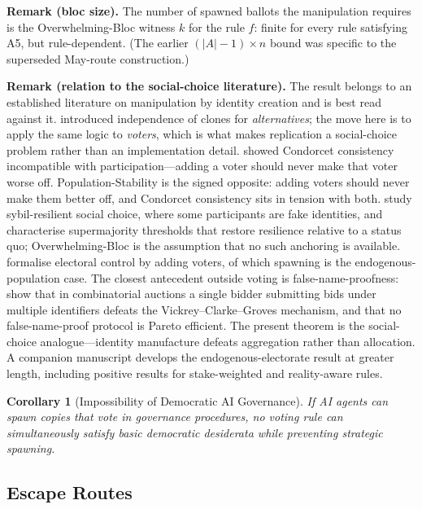 \documentclass[12pt]{article}
\newtheorem{corollary}[theorem]{Corollary}
\newcommand{\added}[1]{\textbf{#1}}
\begin{document}
\noindent\added{\textbf{Remark (bloc size).}} The number of spawned ballots the manipulation requires is the Overwhelming-Bloc witness $k$ for the rule $f$: finite for every rule satisfying A5, but rule-dependent. (The earlier $(|A|-1)\times n$ bound was specific to the superseded May-route construction.)

\noindent\added{\textbf{Remark (relation to the social-choice literature).}} The result belongs to an established literature on manipulation by identity creation and is best read against it. \citet{tideman1987} introduced independence of clones for \emph{alternatives}; the move here is to apply the same logic to \emph{voters}, which is what makes replication a social-choice problem rather than an implementation detail. \citet{moulin1988} showed Condorcet consistency incompatible with participation---adding a voter should never make that voter worse off. Population-Stability is the signed opposite: adding voters should never make them better off, and Condorcet consistency sits in tension with both. \citet{shahaf2019} study sybil-resilient social choice, where some participants are fake identities, and characterise supermajority thresholds that restore resilience relative to a status quo; Overwhelming-Bloc is the assumption that no such anchoring is available. \citet{bartholdi1992} formalise electoral control by adding voters, of which spawning is the endogenous-population case. The closest antecedent outside voting is false-name-proofness: \citet{yokoo2004} show that in combinatorial auctions a single bidder submitting bids under multiple identifiers defeats the Vickrey--Clarke--Groves mechanism, and that no false-name-proof protocol is Pareto efficient. The present theorem is the social-choice analogue---identity manufacture defeats aggregation rather than allocation. A companion manuscript develops the endogenous-electorate result at greater length, including positive results for stake-weighted and reality-aware rules.

\begin{corollary}[Impossibility of Democratic AI Governance]
\label{cor:democratic-ai}
If AI agents can spawn copies that vote in governance procedures, no voting rule can simultaneously satisfy basic democratic desiderata while preventing strategic spawning.
\end{corollary}

\subsection{Escape Routes}
\end{document}
